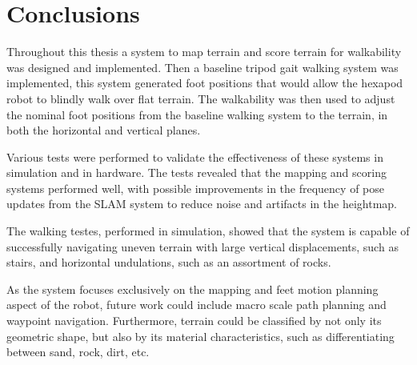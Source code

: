 \chapter{Conclusions}

Throughout this thesis a system to map terrain and score terrain for walkability was designed and implemented. Then a baseline tripod gait walking system
was implemented, this system generated foot positions that would allow the hexapod robot to blindly walk over flat terrain. The walkability was then used
to adjust the nominal foot positions from the baseline walking system to the terrain, in both the horizontal and vertical planes.

Various tests were performed to validate the effectiveness of these systems in simulation and in hardware. The tests revealed that the mapping and scoring
systems performed well, with possible improvements in the frequency of pose updates from the SLAM system to reduce noise and artifacts in the heightmap.

The walking testes, performed in simulation, showed that the system is capable of successfully navigating uneven terrain with large vertical 
displacements, such as stairs, and horizontal undulations, such as an assortment of rocks.

As the system focuses exclusively on the mapping and feet motion planning aspect of the robot, future work could include macro scale path planning and
waypoint navigation. Furthermore, terrain could be classified by not only its geometric shape, but also by its material characteristics, such as 
differentiating between sand, rock, dirt, etc.
